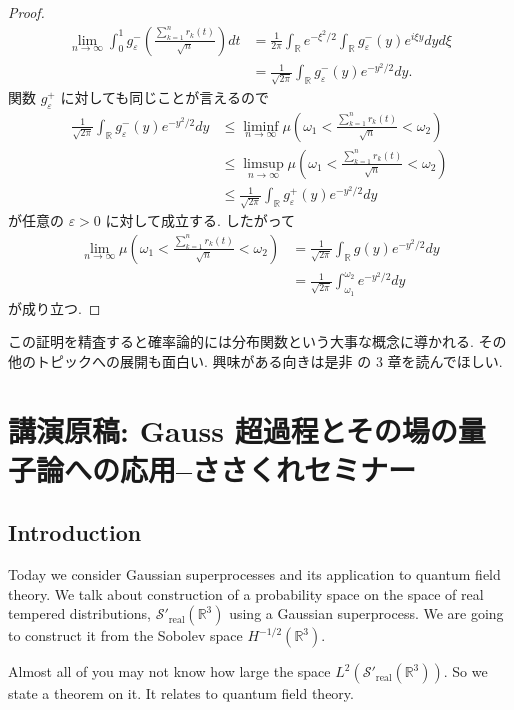 \documentclass[openany, a4paper, oneside]{book}
\theoremstyle{break}
\theoremstyle{breakdefn}
\newcommand{\rbk}[1]{\left (#1\right)}
\newcommand{\bbR}{\mathbb{R}}
\newcommand{\gvarepsilonminus}{g_{\varepsilon}^{-}}
\newcommand{\gvarepsilonplus}{g_{\varepsilon}^{+}}
\newcommand{\liminfntoinfty}{\liminf_{n \to \infty}}
\newcommand{\limntoinfty}{\lim_{n \to \infty}}
\newcommand{\limsupntoinfty}{\limsup_{n \to \infty}}
\newcommand{\realtempereddist}{\mathcal{S}'_{\mathrm{real}}}
\begin{document}
\begin{proof}
\begin{align}
 \limntoinfty \int_0^1 \gvarepsilonminus \rbk{\frac{\sum_{k=1}^{n} r_k (t)}{\sqrt{n}}} dt
 &=
 \frac{1}{2 \pi} \int_{\bbR} e^{- \xi^2 / 2} \int_{\bbR} \gvarepsilonminus (y) e^{i \xi y} dy d\xi \\
 &=
 \frac{1}{\sqrt{2 \pi}} \int_{\bbR} \gvarepsilonminus (y) e^{- y^2 / 2} dy.
\end{align}
関数 $\gvarepsilonplus$ に対しても同じことが言えるので
\begin{align}
 \frac{1}{\sqrt{2 \pi}} \int_{\bbR} \gvarepsilonminus (y) e^{- y^2 / 2} dy
 &\leq
 \liminfntoinfty \mu \rbk{\omega_1 < \frac{\sum_{k=1}^{n} r_k (t)}{\sqrt{n}} < \omega_2} \\
 &\leq
 \limsupntoinfty \mu \rbk{\omega_1 < \frac{\sum_{k=1}^{n} r_k (t)}{\sqrt{n}} < \omega_2} \\
 &\leq
 \frac{1}{\sqrt{2 \pi}} \int_{\bbR} \gvarepsilonplus (y) e^{- y^2 / 2} dy
\end{align}
が任意の $\varepsilon > 0$ に対して成立する.
したがって
\begin{align}
 \limntoinfty \mu \rbk{\omega_1 < \frac{\sum_{k=1}^{n} r_k (t)}{\sqrt{n}} < \omega_2}
 &=
 \frac{1}{\sqrt{2 \pi}} \int_{\bbR} g (y) e^{- y^2 / 2} dy \\
 &=
 \frac{1}{\sqrt{2 \pi}} \int_{\omega_1}^{\omega_2} e^{- y^2 / 2} dy
\end{align}
が成り立つ.
\end{proof}

この証明を精査すると確率論的には分布関数という大事な概念に導かれる.
その他のトピックへの展開も面白い.
興味がある向きは是非 \cite{MarkKac1} の 3 章を読んでほしい.
\chapter{講演原稿: Gauss 超過程とその場の量子論への応用--ささくれセミナー}
\label{sec-8-2}
\section{Introduction}
\label{sec-8-2-1}

Today we consider Gaussian superprocesses and its application to quantum field theory.
We talk about construction of a probability space on the space of real tempered distributions,
$\realtempereddist (\mathbb{R}^3)$ using a Gaussian superprocess.
We are going to construct it from the Sobolev space $H^{-1/2} (\mathbb{R}^3)$.

Almost all of you may not know how large the space $L^2 (\realtempereddist (\mathbb{R}^3))$.
So we state a theorem on it.
It relates to quantum field theory.
\end{document}
